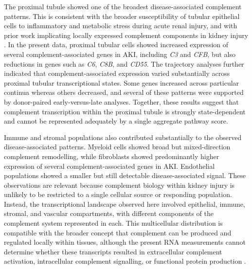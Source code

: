 \documentclass[10pt,letterpaper]{article}
\begin{document}
The proximal tubule showed one of the broadest disease-associated complement patterns. This is consistent with the broader susceptibility of tubular epithelial cells to inflammatory and metabolic stress during acute renal injury, and with prior work implicating locally expressed complement components in kidney injury \cite{willowsRoleComplementKidney2020a,thurmanComplementKidneyOverview2020a}. In the present data, proximal tubular cells showed increased expression of several complement-associated genes in AKI, including \textit{C3} and \textit{CFB}, but also reductions in genes such as \textit{C6}, \textit{C8B}, and \textit{CD55}. The trajectory analyses further indicated that complement-associated expression varied substantially across proximal tubular transcriptional states. Some genes increased across particular continua whereas others decreased, and several of these patterns were supported by donor-paired early-versus-late analyses. Together, these results suggest that complement transcription within the proximal tubule is strongly state-dependent and cannot be represented adequately by a single aggregate pathway score.

Immune and stromal populations also contributed substantially to the observed disease-associated patterns. Myeloid cells showed broad but mixed-direction complement remodelling, while fibroblasts showed predominantly higher expression of several complement-associated genes in AKI. Endothelial populations showed a smaller but still detectable disease-associated signal. These observations are relevant because complement biology within kidney injury is unlikely to be restricted to a single cellular source or responding population. Instead, the transcriptional landscape observed here involved epithelial, immune, stromal, and vascular compartments, with different components of the complement system represented in each. This multicellular distribution is compatible with the broader concept that complement can be produced and regulated locally within tissues, although the present RNA measurements cannot determine whether these transcripts resulted in extracellular complement activation, intracellular complement signalling, or functional protein production \cite{westComplosomeIntracellularComplement2023}.
\end{document}
